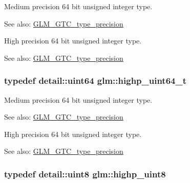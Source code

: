 Medium precision 64 bit unsigned integer type. \begin{Desc}
\item[See also:]\hyperlink{group__gtc__type__precision}{GLM\_\-GTC\_\-type\_\-precision}\end{Desc}
High precision 64 bit unsigned integer type. \begin{Desc}
\item[See also:]\hyperlink{group__gtc__type__precision}{GLM\_\-GTC\_\-type\_\-precision} \end{Desc}
\hypertarget{group__gtc__type__precision_g6e66f40c5909bfc872b068187fa6029e}{
\subsubsection[highp\_\-uint64\_\-t]{\setlength{\rightskip}{0pt plus 5cm}typedef detail::uint64 {\bf glm::highp\_\-uint64\_\-t}}}
\label{group__gtc__type__precision_g6e66f40c5909bfc872b068187fa6029e}


Medium precision 64 bit unsigned integer type. \begin{Desc}
\item[See also:]\hyperlink{group__gtc__type__precision}{GLM\_\-GTC\_\-type\_\-precision}\end{Desc}
High precision 64 bit unsigned integer type. \begin{Desc}
\item[See also:]\hyperlink{group__gtc__type__precision}{GLM\_\-GTC\_\-type\_\-precision} \end{Desc}
\hypertarget{group__gtc__type__precision_g2c27c6dd26e893786f04b10f99c1ee95}{
\subsubsection[highp\_\-uint8]{\setlength{\rightskip}{0pt plus 5cm}typedef detail::uint8 {\bf glm::highp\_\-uint8}}}
\label{group__gtc__type__precision_g2c27c6dd26e893786f04b10f99c1ee95}


